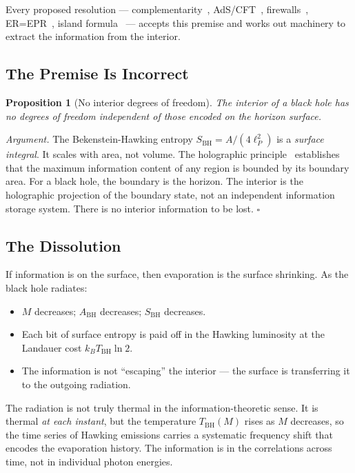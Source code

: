 \documentclass[12pt,letterpaper]{article}
\newtheorem{proposition}{Proposition}
\begin{document}
Every proposed resolution --- complementarity~\cite{Susskind1993},
AdS/CFT~\cite{Maldacena1997}, firewalls~\cite{AMPS2012},
ER=EPR~\cite{MaldacenaSusskind2013}, island formula~\cite{Penington2020,Almheiri2020}
--- accepts this premise and works out machinery to extract
the information from the interior.

\subsection{The Premise Is Incorrect}

\begin{proposition}[No interior degrees of freedom]
The interior of a black hole has no degrees of freedom independent
of those encoded on the horizon surface.
\end{proposition}

\textit{Argument.}
The Bekenstein-Hawking entropy $S_\text{BH} = A/(4\ell_P^2)$ is a
\emph{surface integral}. It scales with area, not volume.
The holographic principle~\cite{tHooft1993} establishes that the
maximum information content of any region is bounded by its boundary area.
For a black hole, the boundary is the horizon.
The interior is the holographic projection of the boundary state,
not an independent information storage system.
There is no interior information to be lost. $\square$

\subsection{The Dissolution}

If information is on the surface, then evaporation is the surface shrinking.
As the black hole radiates:
\begin{itemize}
\item $M$ decreases; $A_\text{BH}$ decreases; $S_\text{BH}$ decreases.
\item Each bit of surface entropy is paid off in the Hawking luminosity
  at the Landauer cost $k_B T_\text{BH}\ln 2$.
\item The information is not ``escaping'' the interior ---
  the surface is transferring it to the outgoing radiation.
\end{itemize}

The radiation is not truly thermal in the information-theoretic sense.
It is thermal \emph{at each instant}, but the temperature $T_\text{BH}(M)$
rises as $M$ decreases, so the time series of Hawking emissions
carries a systematic frequency shift that encodes the evaporation
history. The information is in the correlations across time,
not in individual photon energies.
\end{document}
